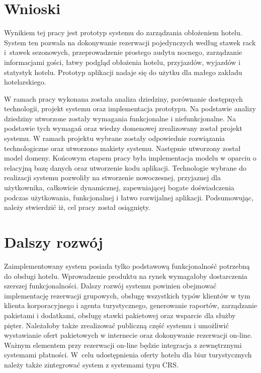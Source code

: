 \documentclass[a4paper,onecolumn,oneside,11pt,wide,floatssmall]{mwrep}
\theoremstyle{definition}
\theoremstyle{plain}%
\theoremstyle{remark}
\begin{document}
\section{Wnioski}
Wynikiem tej pracy jest prototyp systemu do zarządzania obłożeniem hotelu.
System ten pozwala na dokonywanie rezerwacji pojedynczych według stawek rack \mbox{i stawek} sezonowych, przeprowadzenie prostego audytu nocnego, zarządzanie informacjami gości, łatwy podgląd obłożenia hotelu, przyjazdów, wyjazdów i statystyk hotelu. Prototyp aplikacji nadaje się do użytku dla małego zakładu hotelarskiego.

W ramach pracy wykonana została analiza dziedziny, porównanie dostępnych technologii, projekt systemu oraz implementacja prototypu. Na podstawie analizy dziedziny utworzone zostały wymagania funkcjonalne i niefunkcjonalne. Na podstawie tych wymagań oraz wiedzy domenowej zrealizowany został projekt systemu. W ramach projektu wybrane zostały odpowiednie rozwiązania technologiczne oraz utworzono makiety systemu. Następnie utworzony został model domeny. Końcowym etapem pracy była implementacja modelu w oparciu o relacyjną bazę danych oraz utworzenie kodu aplikacji. Technologie wybrane do realizacji systemu pozwoliły na stworzenie nowoczesnej, przyjaznej dla użytkownika, całkowicie dynamicznej, zapewniającej bogate doświadczenia podczas użytkowania, funkcjonalnej i łatwo rozwijalnej aplikacji. Podsumowując, należy stwierdzić iż, cel pracy został osiągnięty.

\section{Dalszy rozwój}
Zaimplementowany system posiada tylko podstawową funkcjonalność potrzebną do obsługi hotelu. Wprowadzenie produktu na rynek wymagałoby dostarczenia szerszej funkcjonalności. Dalszy rozwój systemu powinien obejmować implementację rezerwacji grupowych, obsługę wszystkich typów klientów w tym klienta korporacyjnego i agenta turystycznego, generowanie raportów, zarządzanie pakietami i dodatkami, obsługę stawki pakietowej oraz wsparcie dla służby pięter. Należałoby także zrealizować publiczną część systemu i umożliwić wystawianie ofert pakietowych w internecie oraz dokonywanie rezerwacji on-line. Ważnym elementem przy rezerwacji on-line będzie integracja z zewnętrznymi systemami płatności. \mbox{W celu} udostępnienia oferty hotelu dla biur turystycznych należy także zintegrować system z systemami typu CRS.
\end{document}
